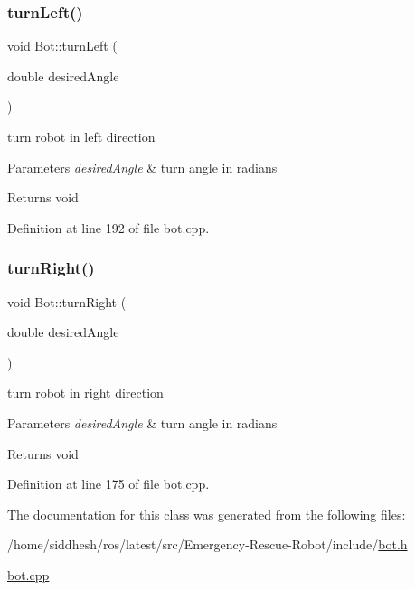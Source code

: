 \subsubsection{\texorpdfstring{turn\+Left()}{turnLeft()}}
{\footnotesize\ttfamily void Bot\+::turn\+Left (\begin{DoxyParamCaption}\item[{double}]{desired\+Angle }\end{DoxyParamCaption})}



turn robot in left direction 


\begin{DoxyParams}{Parameters}
{\em desired\+Angle} & turn angle in radians \\
\hline
\end{DoxyParams}
\begin{DoxyReturn}{Returns}
void 
\end{DoxyReturn}


Definition at line 192 of file bot.\+cpp.

\mbox{\label{class_bot_a07fd8d141a617b711eee7ab3c9e99171}} 
\subsubsection{\texorpdfstring{turn\+Right()}{turnRight()}}
{\footnotesize\ttfamily void Bot\+::turn\+Right (\begin{DoxyParamCaption}\item[{double}]{desired\+Angle }\end{DoxyParamCaption})}



turn robot in right direction 


\begin{DoxyParams}{Parameters}
{\em desired\+Angle} & turn angle in radians \\
\hline
\end{DoxyParams}
\begin{DoxyReturn}{Returns}
void 
\end{DoxyReturn}


Definition at line 175 of file bot.\+cpp.



The documentation for this class was generated from the following files\+:\begin{DoxyCompactItemize}
\item 
/home/siddhesh/ros/latest/src/\+Emergency-\/\+Rescue-\/\+Robot/include/\mbox{\hyperlink{bot_8h}{bot.\+h}}\item 
\mbox{\hyperlink{bot_8cpp}{bot.\+cpp}}\end{DoxyCompactItemize}
